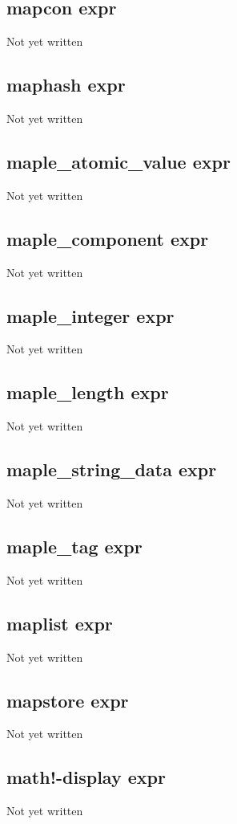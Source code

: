 \documentclass[a4paper,11pt]{article}
\begin{document}
{\subsection{\ttfamily mapcon expr}
Not yet written

\subsection{\ttfamily maphash expr}
Not yet written

\subsection{\ttfamily maple\_atomic\_value expr}
Not yet written

\subsection{\ttfamily maple\_component expr}
Not yet written

\subsection{\ttfamily maple\_integer expr}
Not yet written

\subsection{\ttfamily maple\_length expr}
Not yet written

\subsection{\ttfamily maple\_string\_data expr}
Not yet written

\subsection{\ttfamily maple\_tag expr}
Not yet written

\subsection{\ttfamily maplist expr}
Not yet written

\subsection{\ttfamily mapstore expr}
Not yet written

\subsection{\ttfamily math!-display expr}
Not yet written

}
\end{document}
